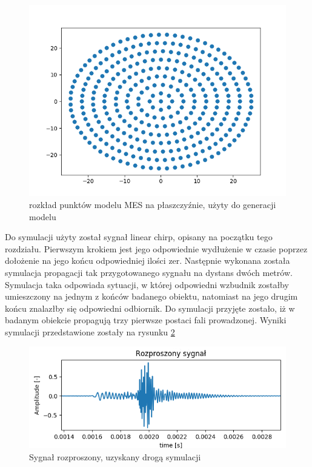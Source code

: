 \begin{figure}[h]
\centering
\includegraphics[width=14cm]{Zdjecia/4/siatka}
\caption{rozkład punktów modelu MES na płaszczyźnie, użyty do generacji modelu}
\label{fig:punktynaplaszczyznie}
\end{figure}

Do symulacji użyty został sygnał linear chirp, opisany na początku tego rozdziału. Pierwszym krokiem jest jego odpowiednie wydłużenie w czasie poprzez dołożenie na jego końcu odpowiedniej ilości zer. Następnie wykonana została symulacja propagacji tak przygotowanego sygnału na dystans dwóch metrów. Symulacja taka odpowiada sytuacji, w której odpowiedni wzbudnik zostałby umieszczony na jednym z końców badanego obiektu, natomiast na jego drugim końcu znalazłby się odpowiedni odbiornik. Do symulacji przyjęte zostało, iż w badanym obiekcie propagują trzy pierwsze postaci fali prowadzonej. Wyniki symulacji przedstawione zostały na rysunku \ref{fig:sygnalrozproszony}

\begin{figure}[h]
\centering
\includegraphics[width=14cm]{Zdjecia/4/sygnalrozproszony}
\caption{Sygnał rozproszony, uzyskany drogą symulacji}
\label{fig:sygnalrozproszony}
\end{figure}

